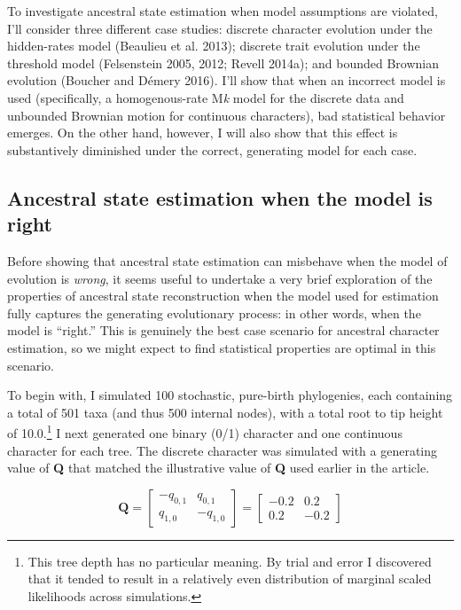 \documentclass{article}
\begin{document}
To investigate ancestral state estimation when model assumptions are violated, I'll consider three different case studies: discrete character evolution under the hidden-rates model (Beaulieu et al. 2013); discrete trait evolution under the threshold model (Felsenstein 2005, 2012; Revell 2014a); and bounded Brownian evolution (Boucher and Démery 2016). I'll show that when an incorrect model is used (specifically, a homogenous-rate M\emph{k} model for the discrete data and unbounded Brownian motion for continuous characters), bad statistical behavior emerges. On the other hand, however, I will also show that this effect is substantively diminished under the correct, generating model for each case.

\subsection{Ancestral state estimation when the model is right}\label{ancestral-state-estimation-when-the-model-is-right}

Before showing that ancestral state estimation can misbehave when the model of evolution is \emph{wrong}, it seems useful to undertake a very brief exploration of the properties of ancestral state reconstruction when the model used for estimation fully captures the generating evolutionary process: in other words, when the model is ``right.'' This is genuinely the best case scenario for ancestral character estimation, so we might expect to find statistical properties are optimal in this scenario.

To begin with, I simulated 100 stochastic, pure-birth phylogenies, each containing a total of 501 taxa (and thus 500 internal nodes), with a total root to tip height of 10.0.\footnote{This tree depth has no particular meaning. By trial and error I discovered that it tended to result in a relatively even distribution of marginal scaled likelihoods across simulations.} I next generated one binary (0/1) character and one continuous character for each tree. The discrete character was simulated with a generating value of \textbf{Q} that matched the illustrative value of \textbf{Q} used earlier in the article.

\[\mathbf{Q} = \begin{bmatrix}-q_{0,1} & q_{0,1} \\ q_{1,0} & -q_{1,0}\end{bmatrix} = \begin{bmatrix}-0.2 & 0.2\\ 0.2 & -0.2\end{bmatrix}\]
\end{document}
